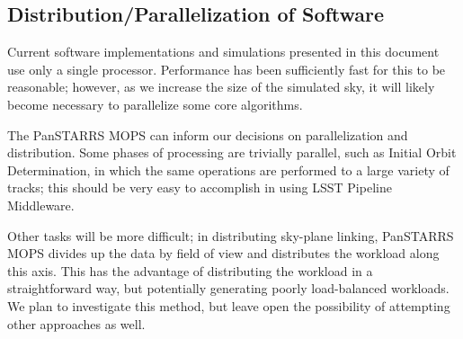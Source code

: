 \documentclass[12pt,preprint]{aastex}
\begin{document}
\subsection{Distribution/Parallelization of Software}

Current software implementations and simulations presented in this
document use only a single processor.  Performance has been
sufficiently fast for this to be reasonable; however, as we increase
the size of the simulated sky, it will likely become necessary to
parallelize some core algorithms.

The PanSTARRS MOPS can inform our decisions on parallelization and
distribution.  Some phases of processing are trivially parallel, such
as Initial Orbit Determination, in which the same operations are
performed to a large variety of tracks; this should be very easy to
accomplish in using LSST Pipeline Middleware.  

Other tasks will be more difficult; in distributing sky-plane linking,
PanSTARRS MOPS divides up the data by field of view and distributes
the workload along this axis.  This has the advantage of distributing
the workload in a straightforward way, but potentially generating
poorly load-balanced workloads.  We plan to investigate this method,
but leave open the possibility of attempting other approaches as well.




\end{document}
